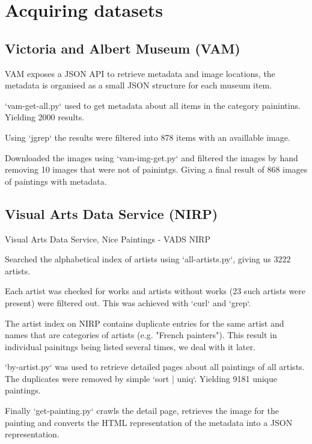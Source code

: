 \documentclass[11pt,a4paper]{report}
\begin{document}
\chapter{Acquiring datasets}

\begin{multicols}{2}

\section{Victoria and Albert Museum (VAM)}

VAM exposes a JSON API to retrieve metadata and image locations, the metadata
is organised as a small JSON structure for each museum item.

`vam-get-all.py` used to get metadata about all items in the category
painintins.  Yielding 2000 results.

Using `jgrep` the results were filtered into 878 items with an availlable
image.

Downloaded the images using `vam-img-get.py` and filtered the images by hand
removing 10 images that were not of painintgs.  Giving a final result of 868
images of paintings with metadata.

\section{Visual Arts Data Service (NIRP)}

Visual Arts Data Service, Nice Paintings - VADS NIRP

Searched the alphabetical index of artists using `all-artists.py`, giving us
3222 artists.

Each artist was checked for works and artists without works (23 such artists
were present) were filtered out.  This was achieved with `curl` and `grep`.

The artist index on NIRP contains duplicate entries for the same artist and
names that are categories of artists (e.g. "French painters").  This result in
individual painitngs being listed several times, we deal with it later.

`by-artist.py` was used to retrieve detailed pages about all paintings of all
artists.  The duplicates were removed by simple `sort | uniq`.  Yielding 9181
unique paintings.

Finally `get-painting.py` crawls the detail page, retrieves the image for the
painting and converts the HTML representation of the metadata into a JSON
representation.


\end{multicols}
\end{document}
